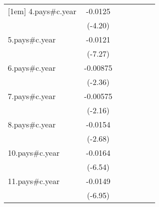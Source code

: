 {\begin{tabular}{l*{6}{c}}
[1em]
4.pays#c.year       &     -0.0125\sym{***}&                     &                     &                     &                     &                     \\
                    &     (-4.20)         &                     &                     &                     &                     &                     \\
[1em]
5.pays#c.year       &     -0.0121\sym{***}&                     &                     &                     &                     &                     \\
                    &     (-7.27)         &                     &                     &                     &                     &                     \\
[1em]
6.pays#c.year       &    -0.00875\sym{*}  &                     &                     &                     &                     &                     \\
                    &     (-2.36)         &                     &                     &                     &                     &                     \\
[1em]
7.pays#c.year       &    -0.00575\sym{*}  &                     &                     &                     &                     &                     \\
                    &     (-2.16)         &                     &                     &                     &                     &                     \\
[1em]
8.pays#c.year       &     -0.0154\sym{**} &                     &                     &                     &                     &                     \\
                    &     (-2.68)         &                     &                     &                     &                     &                     \\
[1em]
10.pays#c.year      &     -0.0164\sym{***}&                     &                     &                     &                     &                     \\
                    &     (-6.54)         &                     &                     &                     &                     &                     \\
[1em]
11.pays#c.year      &     -0.0149\sym{***}&                     &                     &                     &                     &                     \\
                    &     (-6.95)         &                     &                     &                     &                     &                     \\

\end{tabular}}
